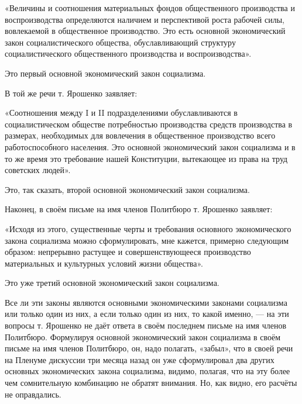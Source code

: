 \documentclass[12pt, a4paper, openany]{book}
\begin{document}
«Величины и соотношения материальных фондов общественного производства и воспроизводства определяются наличием и перспективой роста рабочей силы, вовлекаемой в общественное производство. Это есть основной экономический закон социалистического общества, обуславливающий структуру социалистического общественного производства и воспроизводства».



Это первый основной экономический закон социализма.



В той же речи т. Ярошенко заявляет:



«Соотношения между I и II подразделениями обуславливаются в социалистическом обществе потребностью производства средств производства в размерах, необходимых для вовлечения в общественное производство всего работоспособного населения. Это основной экономический закон социализма и в то же время это требование нашей Конституции, вытекающее из права на труд советских людей».



Это, так сказать, второй основной экономический закон социализма.



Наконец, в своём письме на имя членов Политбюро т. Ярошенко заявляет:



«Исходя из этого, существенные черты и требования основного экономического закона социализма можно сформулировать, мне кажется, примерно следующим образом: непрерывно растущее и совершенствующееся производство материальных и культурных условий жизни общества».



Это уже третий основной экономический закон социализма.



Все ли эти законы являются основными экономическими законами социализма или только один из них, а если только один из них, то какой именно, — на эти вопросы т. Ярошенко не даёт ответа в своём последнем письме на имя членов Политбюро. Формулируя основной экономический закон социализма в своём письме на имя членов Политбюро, он, надо полагать, «забыл», что в своей речи на Пленуме дискуссии три месяца назад он уже сформулировал два других основных экономических закона социализма, видимо, полагая, что на эту более чем сомнительную комбинацию не обратят внимания. Но, как видно, его расчёты не оправдались.
\end{document}
